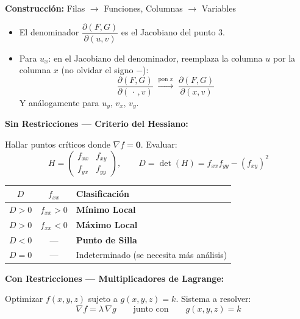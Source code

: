 \documentclass[letterpaper, 12pt]{article}
\newenvironment{seccionbox}[1]{%
    \begin{tcolorbox}[
        colback=celesteSuave,
        colframe=azulFuerte,
        coltitle=white,
        fonttitle=\bfseries\large,
        title=#1,
        arc=6pt,
        boxrule=1pt,
        breakable,
        enhanced,
        before upper={\parskip=4pt}
    ]
}{%
    \end{tcolorbox}
}
\begin{document}
\begin{seccionbox}{5. Teorema de la Función Implícita}
\textbf{Construcción:} \textcolor{azulFuerte}{Filas $\to$ Funciones}, \textcolor{turquesaUsach}{Columnas $\to$ Variables}
\begin{itemize}
    \item El denominador $\dfrac{\partial(F,G)}{\partial(u,v)}$ es el Jacobiano del punto 3.
    \item Para $u_x$: en el Jacobiano del denominador, reemplaza la columna $u$ por la columna $x$ \textcolor{rojoAviso}{(no olvidar el signo $-$)}:
    $$\frac{\partial(F,G)}{\partial(\,\cdot\,,v)} \;\xrightarrow{\text{pon }x}\; \frac{\partial(F,G)}{\partial(x,v)}$$
    Y análogamente para $u_y,\,v_x,\,v_y$.
\end{itemize}

\end{seccionbox}

\newpage

\begin{seccionbox}{6. Optimización (Máximos y Mínimos)}

\textbf{Sin Restricciones — Criterio del Hessiano:}

Hallar puntos críticos donde $\nabla f = \mathbf{0}$. Evaluar:
$$ H = \begin{pmatrix} f_{xx} & f_{xy} \\ f_{yx} & f_{yy} \end{pmatrix}, \qquad D = \det(H) = f_{xx}f_{yy} - (f_{xy})^2 $$

\begin{center}
\begin{tabular}{c|c|l}
\hline
$D$ & $f_{xx}$ & Clasificación \\
\hline
$D > 0$ & $f_{xx} > 0$ & \textcolor{verdeOk}{\textbf{Mínimo Local}} \\
$D > 0$ & $f_{xx} < 0$ & \textcolor{verdeOk}{\textbf{Máximo Local}} \\
$D < 0$ & — & \textcolor{rojoAviso}{\textbf{Punto de Silla}} \\
$D = 0$ & — & Indeterminado (se necesita más análisis) \\
\hline
\end{tabular}
\end{center}

\medskip
\textbf{Con Restricciones — Multiplicadores de Lagrange:}

Optimizar $f(x,y,z)$ sujeto a $g(x,y,z) = k$. Sistema a resolver:
$$ \nabla f = \lambda\, \nabla g \qquad \text{junto con} \qquad g(x,y,z) = k $$

\end{seccionbox}
\end{document}
